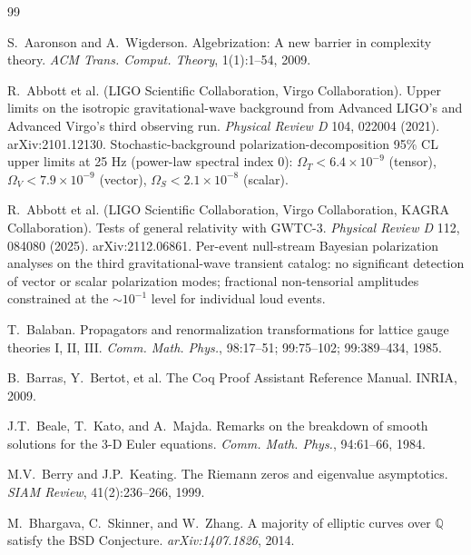 \documentclass[11pt,a4paper]{amsart}
\theoremstyle{plain}
\theoremstyle{definition}
\begin{document}

\begin{thebibliography}{99}

S.~Aaronson and A.~Wigderson.
\newblock Algebrization: A new barrier in complexity theory.
\newblock \emph{ACM Trans. Comput. Theory}, 1(1):1--54, 2009.

R.~Abbott et al. (LIGO Scientific Collaboration, Virgo Collaboration).
\newblock Upper limits on the isotropic gravitational-wave background from Advanced LIGO's and Advanced Virgo's third observing run.
\newblock \emph{Physical Review D} 104, 022004 (2021). arXiv:2101.12130. Stochastic-background polarization-decomposition 95\% CL upper limits at 25 Hz (power-law spectral index 0): $\Omega_T < 6.4 \times 10^{-9}$ (tensor), $\Omega_V < 7.9 \times 10^{-9}$ (vector), $\Omega_S < 2.1 \times 10^{-8}$ (scalar).

R.~Abbott et al. (LIGO Scientific Collaboration, Virgo Collaboration, KAGRA Collaboration).
\newblock Tests of general relativity with GWTC-3.
\newblock \emph{Physical Review D} 112, 084080 (2025). arXiv:2112.06861. Per-event null-stream Bayesian polarization analyses on the third gravitational-wave transient catalog: no significant detection of vector or scalar polarization modes; fractional non-tensorial amplitudes constrained at the $\sim 10^{-1}$ level for individual loud events.

T.~Balaban.
\newblock Propagators and renormalization transformations for lattice gauge theories I, II, III.
\newblock \emph{Comm. Math. Phys.}, 98:17--51; 99:75--102; 99:389--434, 1985.

B.~Barras, Y.~Bertot, et al.
\newblock The Coq Proof Assistant Reference Manual.
\newblock INRIA, 2009.

J.T.~Beale, T.~Kato, and A.~Majda.
\newblock Remarks on the breakdown of smooth solutions for the 3-D Euler equations.
\newblock \emph{Comm. Math. Phys.}, 94:61--66, 1984.

M.V.~Berry and J.P.~Keating.
\newblock The Riemann zeros and eigenvalue asymptotics.
\newblock \emph{SIAM Review}, 41(2):236--266, 1999.

M.~Bhargava, C.~Skinner, and W.~Zhang.
\newblock A majority of elliptic curves over $\mathbb{Q}$ satisfy the BSD Conjecture.
\newblock \emph{arXiv:1407.1826}, 2014.


\end{thebibliography}
\end{document}

